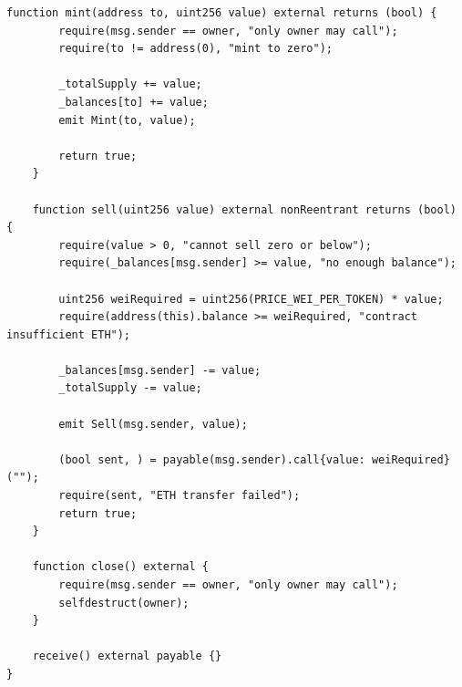 \documentclass[10pt,a4paper]{article}
\begin{document}
\begin{lstlisting}[caption={Stage1.sol}]
    function mint(address to, uint256 value) external returns (bool) {
        require(msg.sender == owner, "only owner may call");
        require(to != address(0), "mint to zero");

        _totalSupply += value;
        _balances[to] += value;
        emit Mint(to, value);

        return true;
    }

    function sell(uint256 value) external nonReentrant returns (bool) {
        require(value > 0, "cannot sell zero or below");
        require(_balances[msg.sender] >= value, "no enough balance");

        uint256 weiRequired = uint256(PRICE_WEI_PER_TOKEN) * value;
        require(address(this).balance >= weiRequired, "contract insufficient ETH");

        _balances[msg.sender] -= value;
        _totalSupply -= value;

        emit Sell(msg.sender, value);

        (bool sent, ) = payable(msg.sender).call{value: weiRequired}("");
        require(sent, "ETH transfer failed");
        return true;
    }

    function close() external {
        require(msg.sender == owner, "only owner may call");
        selfdestruct(owner);
    }

    receive() external payable {}
}
\end{lstlisting}
\end{document}
